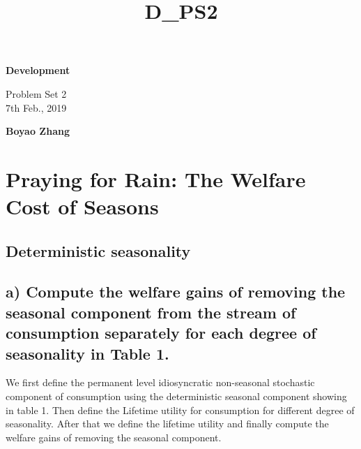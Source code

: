 \documentclass[11pt]{article}
\title{D\_PS2}
\makeatletter
\def\maxwidth{\ifdim\Gin@nat@width>\linewidth\linewidth
    \else\Gin@nat@width\fi}
\let\Oldincludegraphics\includegraphics
\renewcommand{\includegraphics}[1]{\Oldincludegraphics[width=.8\maxwidth]{#1}}
\makeatother
\begin{document}
	
	\begin{titlepage}
		\begin{center}
			\hspace{0pt}
			\vfill
			
			\textbf{\LARGE{Development}}
			
			\vspace{0.5cm}
			\large{Problem Set 2 \\
				7th Feb., 2019}
			
			\vspace{0.5cm}
			
			\textbf{\large{Boyao Zhang}}
			
			
			\vfill
			
			
		\end{center}
	\end{titlepage}
	
	
	\section*{Praying for Rain: The Welfare Cost of Seasons}
	\subsection*{Deterministic seasonality} 
	\subsection*{a) Compute the welfare gains of removing the seasonal component from the stream of consumption separately for each degree of seasonality in Table 1.}
	

	We first define the permanent level idiosyncratic non-seasonal stochastic component of consumption using the deterministic seasonal component showing in table 1. Then define the Lifetime utility for consumption for different degree of seasonality. After that we define the lifetime utility and finally compute the welfare gains of removing the seasonal component.
	
\end{document}
